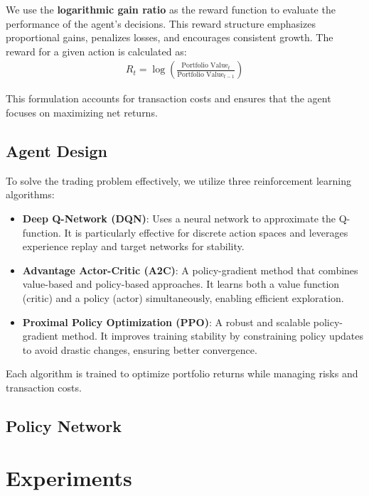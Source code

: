 \documentclass[conference]{IEEEtran}
\begin{document}
We use the \textbf{logarithmic gain ratio} as the reward function to evaluate the performance of the agent's decisions. This reward structure emphasizes proportional gains, penalizes losses, and encourages consistent growth. The reward for a given action is calculated as:
\begin{align*}
R_t = \log\left(\frac{\text{Portfolio Value}_{t}}{\text{Portfolio Value}_{t-1}}\right)
\end{align*}

This formulation accounts for transaction costs and ensures that the agent focuses on maximizing net returns.

\subsection{Agent Design}

To solve the trading problem effectively, we utilize three reinforcement learning algorithms:

\begin{itemize}
    \item \textbf{Deep Q-Network (DQN)}: Uses a neural network to approximate the Q-function. It is particularly effective for discrete action spaces and leverages experience replay and target networks for stability.
    \item \textbf{Advantage Actor-Critic (A2C)}: A policy-gradient method that combines value-based and policy-based approaches. It learns both a value function (critic) and a policy (actor) simultaneously, enabling efficient exploration.
    \item \textbf{Proximal Policy Optimization (PPO)}: A robust and scalable policy-gradient method. It improves training stability by constraining policy updates to avoid drastic changes, ensuring better convergence.
\end{itemize}

Each algorithm is trained to optimize portfolio returns while managing risks and transaction costs.

\subsection{Policy Network}


\section{Experiments}
\end{document}
